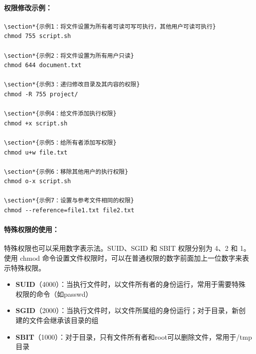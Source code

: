 \documentclass[12pt,UTF8]{ctexbook}
\begin{document}
\paragraph{权限修改示例：}
\begin{verbatim}
\section*{示例1：将文件设置为所有者可读可写可执行，其他用户可读可执行}
chmod 755 script.sh

\section*{示例2：将文件设置为所有用户只读}
chmod 644 document.txt

\section*{示例3：递归修改目录及其内容的权限}
chmod -R 755 project/

\section*{示例4：给文件添加执行权限}
chmod +x script.sh

\section*{示例5：给所有者添加写权限}
chmod u+w file.txt

\section*{示例6：移除其他用户的执行权限}
chmod o-x script.sh

\section*{示例7：设置与参考文件相同的权限}
chmod --reference=file1.txt file2.txt
\end{verbatim}

\paragraph{特殊权限的使用：}
特殊权限也可以采用数字表示法。SUID、SGID 和 SBIT 权限分别为 4、2 和 1。使用 chmod 命令设置文件权限时，可以在普通权限的数字前面加上一位数字来表示特殊权限。

\begin{itemize}
    \item \textbf{SUID}（4000）：当执行文件时，以文件所有者的身份运行，常用于需要特殊权限的命令（如passwd）
    \item \textbf{SGID}（2000）：当执行文件时，以文件所属组的身份运行；对于目录，新创建的文件会继承该目录的组
    \item \textbf{SBIT}（1000）：对于目录，只有文件所有者和root可以删除文件，常用于/tmp目录
\end{itemize}
\end{document}
